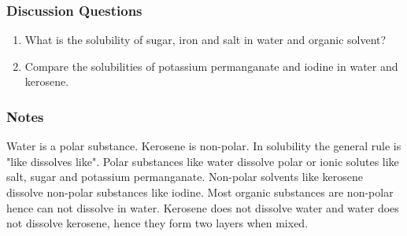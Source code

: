 \subsubsection*{Discussion Questions}
\begin{enumerate}
\item{What is the solubility of sugar, iron and salt in water and organic solvent?}
\item{Compare the solubilities of potassium permanganate and iodine in water and kerosene.}
\end{enumerate}

\subsubsection*{Notes}
Water is a polar substance. Kerosene is non-polar. In solubility the general rule is "like dissolves like". Polar substances like water dissolve polar or ionic solutes like salt, sugar and potassium permanganate. Non-polar solvents like kerosene dissolve non-polar substances like iodine. Most organic substances are non-polar hence can not dissolve in water. Kerosene does not dissolve water and water does not dissolve kerosene, hence they form two layers when mixed.
